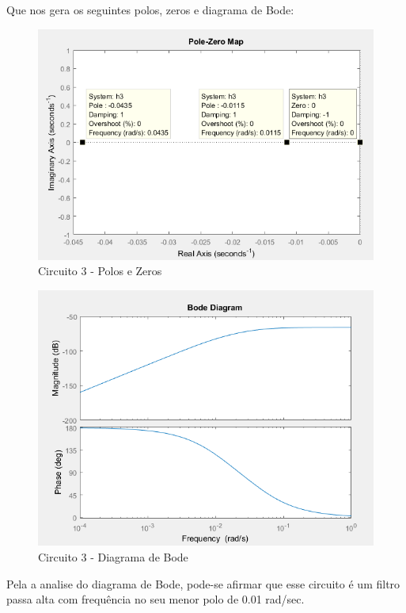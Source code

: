 \documentclass[a4paper, 12pt]{article}
\begin{document}
			Que nos gera os seguintes polos, zeros e diagrama de Bode:
			\begin{figure}[!ht]
				\centering
				\includegraphics[scale=0.7]{img/1e_circ3.png}
				\caption{Circuito 3 - Polos e Zeros}
			\end{figure}
			\newpage
			\begin{figure}[!ht]
				\centering
				\includegraphics[scale=0.7]{img/1f_circ3.png}
				\caption{Circuito 3 - Diagrama de Bode}
			\end{figure}
			Pela a analise do diagrama de Bode, pode-se afirmar que esse circuito é um filtro passa alta com frequência no seu menor polo de 0.01 rad/sec.
\end{document}
